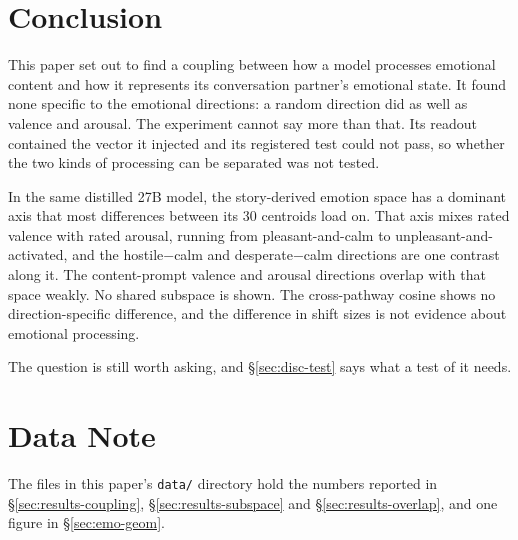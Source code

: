 \documentclass[11pt,a4paper]{article}
\begin{document}
\section{Conclusion}
\label{sec:conclusion}

This paper set out to find a coupling between how a model processes emotional content and how it represents its conversation partner's emotional state. It found none specific to the emotional directions: a random direction did as well as valence and arousal. The experiment cannot say more than that. Its readout contained the vector it injected and its registered test could not pass, so whether the two kinds of processing can be separated was not tested.

In the same distilled 27B model, the story-derived emotion space has a dominant axis that most differences between its 30 centroids load on. That axis mixes rated valence with rated arousal, running from pleasant-and-calm to unpleasant-and-activated, and the hostile$-$calm and desperate$-$calm directions are one contrast along it. The content-prompt valence and arousal directions overlap with that space weakly. No shared subspace is shown. The cross-pathway cosine shows no direction-specific difference, and the difference in shift sizes is not evidence about emotional processing.

The question is still worth asking, and \S\ref{sec:disc-test} says what a test of it needs.

\section*{Data Note}
\sloppy %

The files in this paper's \texttt{data/} directory hold the numbers reported in \S\ref{sec:results-coupling}, \S\ref{sec:results-subspace} and \S\ref{sec:results-overlap}, and one figure in \S\ref{sec:emo-geom}.
\end{document}
